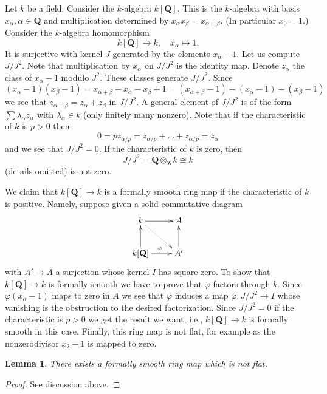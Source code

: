 \documentclass[10pt,a4paper]{amsart}
\theoremstyle{plain}
\newtheorem{lemma}[subsection]{Lemma}
\theoremstyle{definition}
\theoremstyle{remark}
\numberwithin{equation}{subsection}
\begin{document}
\noindent
Let $k$ be a field. Consider the $k$-algebra $k[\mathbf{Q}]$.
This is the $k$-algebra with basis $x_\alpha, \alpha \in \mathbf{Q}$
and multiplication determined by $x_\alpha x_\beta = x_{\alpha + \beta}$.
(In particular $x_0 = 1$.)
Consider the $k$-algebra homomorphism
$$
k[\mathbf{Q}] \longrightarrow k, \quad
x_\alpha \longmapsto 1.
$$
It is surjective with kernel $J$ generated by the elements $x_\alpha - 1$.
Let us compute $J/J^2$. Note that multiplication by $x_\alpha$ on $J/J^2$
is the identity map. Denote $z_\alpha$ the class of $x_\alpha - 1$ modulo
$J^2$. These classes generate $J/J^2$. Since
$$
(x_\alpha - 1)(x_\beta - 1) = x_{\alpha + \beta} - x_\alpha - x_\beta + 1 =
(x_{\alpha + \beta} - 1) - (x_\alpha - 1) - (x_\beta - 1)
$$
we see that $z_{\alpha + \beta} = z_\alpha + z_\beta$ in $J/J^2$.
A general element of $J/J^2$ is of the form $\sum \lambda_\alpha z_\alpha$
with $\lambda_\alpha \in k$ (only finitely many nonzero). Note that if the
characteristic of $k$ is $p > 0$ then
$$
0 = pz_{\alpha/p} = z_{\alpha/p} + \ldots + z_{\alpha/p} = z_\alpha
$$
and we see that $J/J^2 = 0$. If the characteristic of $k$ is zero, then
$$
J/J^2 = \mathbf{Q} \otimes_{\mathbf{Z}} k \cong k
$$
(details omitted) is not zero.

\medskip\noindent
We claim that $k[\mathbf{Q}] \to k$ is a formally smooth ring map
if the characteristic of $k$ is positive. Namely, suppose given a
solid commutative diagram
$$
\xymatrix{
k \ar[r] \ar@{..>}[rd] & A \\
k[\mathbf{Q}] \ar[u] \ar[r]^\varphi & A' \ar[u]
}
$$
with $A' \to A$ a surjection whose kernel $I$ has square zero.
To show that $k[\mathbf{Q}] \to k$ is formally smooth we have to prove
that $\varphi$ factors through $k$. Since $\varphi(x_\alpha - 1)$ maps
to zero in $A$ we see that $\varphi$ induces a map
$\overline{\varphi} : J/J^2 \to I$ whose vanishing is the obstruction
to the desired factorization. Since $J/J^2 = 0$ if the characteristic
is $p > 0$ we get the result we want, i.e., $k[\mathbf{Q}] \to k$ is
formally smooth in this case. Finally, this ring map is not flat, for
example as the nonzerodivisor $x_2 - 1$ is mapped to zero.


\begin{lemma}
\label{lemma-formally-smooth-nonflat}
There exists a formally smooth ring map which is not flat.
\end{lemma}

\begin{proof}
See discussion above.
\end{proof}
\end{document}
